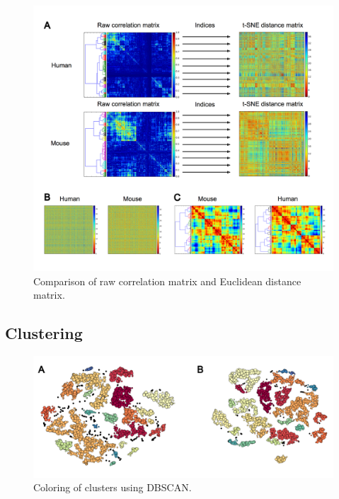 \documentclass[12pt,oneside,onecolumn,a4paper]{article}
\begin{document}
\begin{figure}[H]
\begin{center}
\includegraphics[width=\columnwidth]{figures/correlations}
\caption{Comparison of raw correlation matrix and Euclidean distance matrix. \label{fig:new_matrix}%
}
\end{center}
\end{figure}

\subsection{Clustering}

\begin{figure}[H]
\begin{center}
\includegraphics[width=\columnwidth]{figures/dbscan}
\caption{Coloring of clusters using DBSCAN. \label{fig:DBSCAN}%
}
\end{center}
\end{figure}
\end{document}
